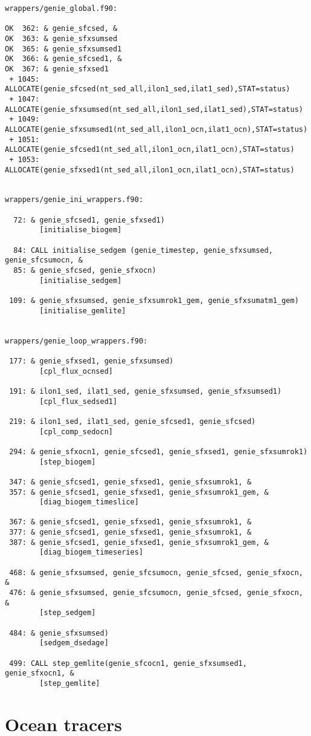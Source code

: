 \documentclass[a4paper,10pt,article]{memoir}
\begin{document}
\begin{verbatim}
wrappers/genie_global.f90:

OK  362: & genie_sfcsed, &
OK  363: & genie_sfxsumsed
OK  365: & genie_sfxsumsed1
OK  366: & genie_sfcsed1, &
OK  367: & genie_sfxsed1
 + 1045: ALLOCATE(genie_sfcsed(nt_sed_all,ilon1_sed,ilat1_sed),STAT=status)
 + 1047: ALLOCATE(genie_sfxsumsed(nt_sed_all,ilon1_sed,ilat1_sed),STAT=status)
 + 1049: ALLOCATE(genie_sfxsumsed1(nt_sed_all,ilon1_ocn,ilat1_ocn),STAT=status)
 + 1051: ALLOCATE(genie_sfcsed1(nt_sed_all,ilon1_ocn,ilat1_ocn),STAT=status)
 + 1053: ALLOCATE(genie_sfxsed1(nt_sed_all,ilon1_ocn,ilat1_ocn),STAT=status)


wrappers/genie_ini_wrappers.f90:

  72: & genie_sfcsed1, genie_sfxsed1)
        [initialise_biogem]

  84: CALL initialise_sedgem (genie_timestep, genie_sfxsumsed, genie_sfcsumocn, &
  85: & genie_sfcsed, genie_sfxocn)
        [initialise_sedgem]

 109: & genie_sfxsumsed, genie_sfxsumrok1_gem, genie_sfxsumatm1_gem)
        [initialise_gemlite]


wrappers/genie_loop_wrappers.f90:

 177: & genie_sfxsed1, genie_sfxsumsed)
        [cpl_flux_ocnsed]

 191: & ilon1_sed, ilat1_sed, genie_sfxsumsed, genie_sfxsumsed1)
        [cpl_flux_sedsed1]

 219: & ilon1_sed, ilat1_sed, genie_sfcsed1, genie_sfcsed)
        [cpl_comp_sedocn]

 294: & genie_sfxocn1, genie_sfcsed1, genie_sfxsed1, genie_sfxsumrok1)
        [step_biogem]

 347: & genie_sfcsed1, genie_sfxsed1, genie_sfxsumrok1, &
 357: & genie_sfcsed1, genie_sfxsed1, genie_sfxsumrok1_gem, &
        [diag_biogem_timeslice]

 367: & genie_sfcsed1, genie_sfxsed1, genie_sfxsumrok1, &
 377: & genie_sfcsed1, genie_sfxsed1, genie_sfxsumrok1, &
 387: & genie_sfcsed1, genie_sfxsed1, genie_sfxsumrok1_gem, &
        [diag_biogem_timeseries]

 468: & genie_sfxsumsed, genie_sfcsumocn, genie_sfcsed, genie_sfxocn, &
 476: & genie_sfxsumsed, genie_sfcsumocn, genie_sfcsed, genie_sfxocn, &
        [step_sedgem]

 484: & genie_sfxsumsed)
        [sedgem_dsedage]

 499: CALL step_gemlite(genie_sfcocn1, genie_sfxsumsed1, genie_sfxocn1, &
        [step_gemlite]
\end{verbatim}

\section{Ocean tracers}
\end{document}
